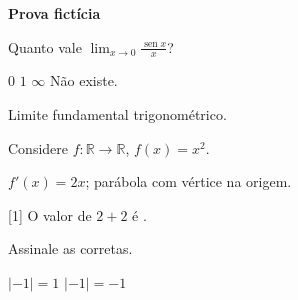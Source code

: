 \documentclass[addpoints]{exam}
\newcommand{\R}{\mathbb{R}}
\DeclareMathOperator{\sen}{sen}
\newcommand{\abs}[1]{\left|#1\right|}
\begin{document}
\begin{center}\textbf{Prova fictícia}\end{center}
\begin{questions}

\question[2] Quanto vale $\displaystyle\lim_{x\to 0}\frac{\sen x}{x}$?
\begin{choices}
  \choice $0$
  \CorrectChoice $1$
  \choice $\infty$
  \choice Não existe.
\end{choices}
\begin{solution}
Limite fundamental trigonométrico.
\end{solution}

\question[3] Considere $f\colon\R\to\R$, $f(x)=x^2$.
\begin{solutionorbox}[2in]
$f'(x) = 2x$; parábola com vértice na origem.
\end{solutionorbox}


[1] O valor de $2+2$ é \fillin[$4$][2cm].

\question Assinale as corretas.
\begin{oneparchoices}
\CorrectChoice $\abs{-1}=1$ \choice $\abs{-1}=-1$
\end{oneparchoices}
\vspace{2cm}

\end{questions}
\end{document}
